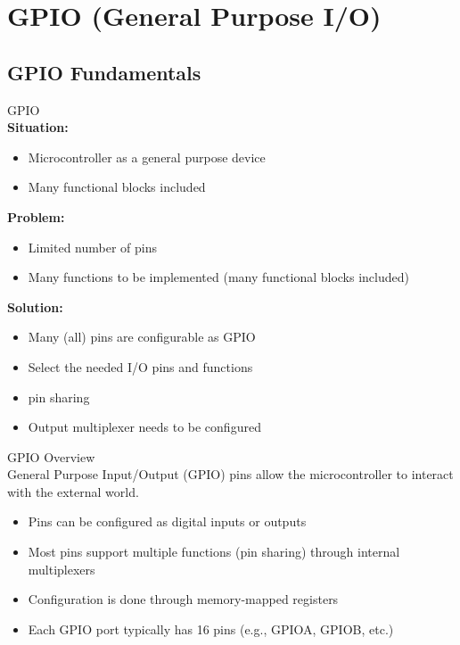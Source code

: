 \section{GPIO (General Purpose I/O)}

\subsection{GPIO Fundamentals}

\begin{definition}{GPIO}\\
    \textbf{Situation:}
    \begin{itemize}
        \item Microcontroller as a general purpose device
        \item Many functional blocks included
    \end{itemize}

    \textbf{Problem:}
    \begin{itemize}
        \item Limited number of pins
        \item Many functions to be implemented (many functional blocks included)
    \end{itemize}

    \textbf{Solution:}
    \begin{itemize}
        \item Many (all) pins are configurable as GPIO
        \item Select the needed I/O pins and functions
        \item \oq pin sharing\cq
        \item Output multiplexer needs to be configured
    \end{itemize}
\end{definition}

\begin{concept}{GPIO Overview}\\
General Purpose Input/Output (GPIO) pins allow the microcontroller to interact with the external world.
\begin{itemize}
    \item Pins can be configured as digital inputs or outputs
    \item Most pins support multiple functions (pin sharing) through internal multiplexers
    \item Configuration is done through memory-mapped registers
    \item Each GPIO port typically has 16 pins (e.g., GPIOA, GPIOB, etc.)
\end{itemize}
\end{concept}

